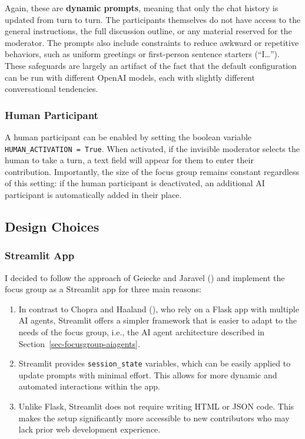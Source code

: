 \documentclass[
  letterpaper,
  DIV=11,
  numbers=noendperiod]{scrartcl}
\begin{document}
Again, these are \textbf{dynamic prompts}, meaning that only the chat
history is updated from turn to turn. The participants themselves do not
have access to the general instructions, the full discussion outline, or
any material reserved for the moderator. The prompts also include
constraints to reduce awkward or repetitive behaviors, such as uniform
greetings or first-person sentence starters (``I\ldots{}''). These
safeguards are largely an artifact of the fact that the default
configuration can be run with different OpenAI models, each with
slightly different conversational tendencies.

\subsubsection{Human Participant}\label{sec-focusgroup-aiagents-human}

A human participant can be enabled by setting the boolean variable
\texttt{HUMAN\_ACTIVATION\ =\ True}. When activated, if the invisible
moderator selects the human to take a turn, a text field will appear for
them to enter their contribution. Importantly, the size of the focus
group remains constant regardless of this setting: if the human
participant is deactivated, an additional AI participant is
automatically added in their place.

\subsection{Design Choices}\label{sec-focusgroup-design}

\subsubsection{Streamlit App}\label{sec-focusgroup-design-streamlitapp}

I decided to follow the approach of Geiecke and Jaravel
() and implement the focus
group as a Streamlit app for three main reasons:

\begin{enumerate}
\def\labelenumi{\arabic{enumi}.}
\item
  In contrast to Chopra and Haaland
  (), who rely on a Flask app
  with multiple AI agents, Streamlit offers a simpler framework that is
  easier to adapt to the needs of the focus group, i.e., the AI agent
  architecture described in Section~\ref{sec-focusgroup-aiagents}.
\item
  Streamlit provides \texttt{session\_state} variables, which can be
  easily applied to update prompts with minimal effort. This allows for
  more dynamic and automated interactions within the app.
\item
  Unlike Flask, Streamlit does not require writing HTML or JSON code.
  This makes the setup significantly more accessible to new contributors
  who may lack prior web development experience.
\end{enumerate}
\end{document}
